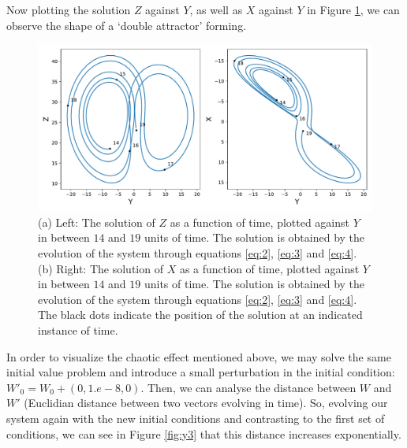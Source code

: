 \documentclass[10pt, letterpaper]{article}
\begin{document}
Now plotting the solution $Z$ against $Y$, as well as $X$ against $Y$ in Figure \ref{fig:y2}, we can observe the shape of a `double attractor' forming.
\begin{figure}[H]
    \hspace*{-5mm}
        \centering
        \includegraphics[width =\textwidth]{attract.pdf}
        \caption{(a) Left: The solution of $Z$ as a function of time, plotted against $Y$ in between $14$ and $19$ units of time. The solution is obtained by the evolution of the system through equations \ref{eq:2}, \ref{eq:3} and \ref{eq:4}. (b) Right: The solution of $X$ as a function of time, plotted against $Y$ in between $14$ and $19$ units of time. The solution is obtained by the evolution of the system through equations \ref{eq:2}, \ref{eq:3} and \ref{eq:4}. The black dots indicate the position of the solution at an indicated instance of time.}
        \label{fig:y2}
\end{figure}

In order to visualize the chaotic effect mentioned above, we may solve the same initial value problem and introduce a small perturbation in the initial condition: $W'_0 = W_0 + (0, 1.e-8, 0)$. Then, we can analyse the distance between $W$ and $W'$ (Euclidian distance between two vectors evolving in time). So, evolving our system again with the new initial conditions and contrasting to the first set of conditions, we can see in Figure \ref{fig:y3} that this distance increases exponentially.
\end{document}
